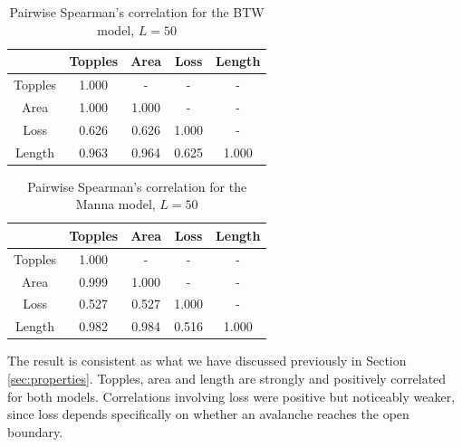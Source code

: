 \begin{table}[!h]
    \centering
    \begin{tabular}{ccccc}\toprule
         &  Topples&  Area&  Loss& Length\\\midrule
         Topples&  1.000&  -&  -& -\\
         Area&  1.000&  1.000&  -& -\\
         Loss&  0.626&  0.626&  1.000& -\\
         Length&  0.963&  0.964&  0.625& 1.000\\ \bottomrule
    \end{tabular}
    \caption{Pairwise Spearman's correlation for the BTW model, $L=50$}
    \label{tab:corrBTW50}
\end{table}

\begin{table}[!h]
    \centering
    \begin{tabular}{ccccc}\toprule
         &  Topples&  Area&  Loss& Length\\\midrule
         Topples&  1.000&  -&  -& -\\
         Area&  0.999&  1.000&  -& -\\
         Loss&  0.527&  0.527&  1.000& -\\
         Length&  0.982&  0.984&  0.516& 1.000\\ \bottomrule
    \end{tabular}
    \caption{Pairwise Spearman's correlation for the Manna model, $L=50$}
    \label{tab:corrManna50}
\end{table}

The result is consistent as what we have discussed previously in Section \ref{sec:properties}. Topples, area and length are strongly and positively correlated for both models. Correlations involving loss were positive but noticeably weaker, since loss depends specifically on whether an avalanche reaches the open boundary.
